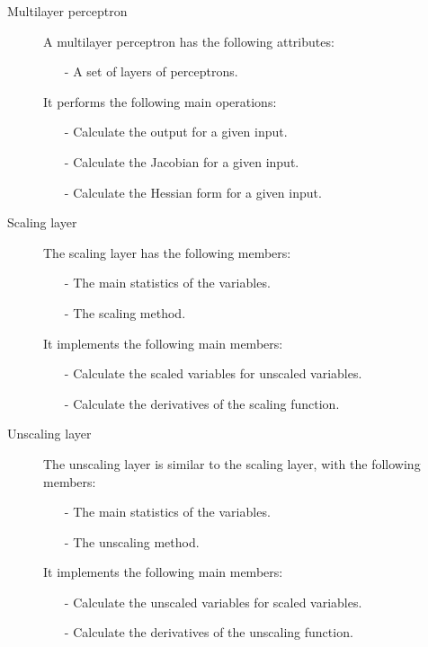 \begin{description}
\item[Multilayer perceptron] A multilayer perceptron has the following attributes:

\begin{itemize}
\item[-] A set of layers of perceptrons.
\end{itemize}

It performs the following main operations:

\begin{itemize}
\item[-] Calculate the output for a given input.
\item[-] Calculate the Jacobian for a given input.
\item[-] Calculate the Hessian form for a given input.
\end{itemize}

\item[Scaling layer] The scaling layer has the following members:

\begin{itemize}
\item[-] The main statistics of the variables.
\item[-] The scaling method.
\end{itemize}

It implements the following main members:

\begin{itemize}
\item[-] Calculate the scaled variables for unscaled variables.
\item[-] Calculate the derivatives of the scaling function.
\end{itemize}

\item[Unscaling layer] The unscaling layer is similar to the scaling layer, 
with the following members:

\begin{itemize}
\item[-] The main statistics of the variables.
\item[-] The unscaling method.
\end{itemize}

It implements the following main members:

\begin{itemize}
\item[-] Calculate the unscaled variables for scaled variables.
\item[-] Calculate the derivatives of the unscaling function.
\end{itemize}


\end{description}
